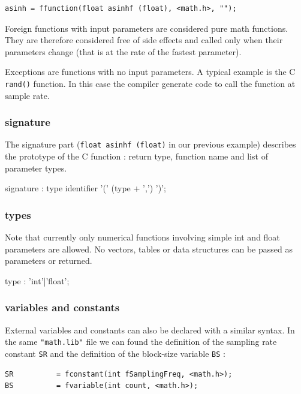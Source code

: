 \documentclass[a4paper,10pt]{book}
\begin{document}
\begin{lstlisting}
asinh = ffunction(float asinhf (float), <math.h>, "");
\end{lstlisting}

Foreign functions with input parameters are considered pure math functions. They are therefore considered free of side effects and called only when their parameters change (that is at the rate of the fastest parameter). 

Exceptions are functions with no input parameters. A typical example is the C \lstinline'rand()' function. In this case the compiler generate code to call the function at sample rate.


\subsubsection{signature} 
The signature part (\lstinline'float asinhf (float)' in our previous example) describes the prototype of the C function : return type, function name and list of parameter types. 

\begin{rail}
signature : type identifier '(' (type + ',') ')';
\end{rail}


\subsubsection{types}
Note that currently only numerical functions involving simple int and float parameters are allowed. No vectors, tables or data structures can be passed as parameters or returned.

\begin{rail}
type : 'int'|'float';
\end{rail}

\subsubsection{variables and constants} 
External variables and constants can also be declared with a similar syntax. In the same \lstinline'"math.lib"' file we can found the definition of the sampling rate constant \lstinline'SR' and the definition of the block-size variable \lstinline'BS' :

\begin{lstlisting}
SR 			= fconstant(int fSamplingFreq, <math.h>);
BS          = fvariable(int count, <math.h>);
\end{lstlisting}
\end{document}
